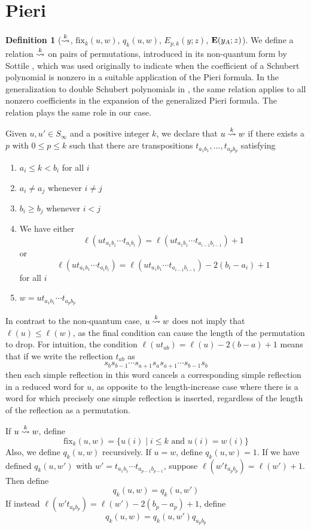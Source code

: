 \documentclass{amsart}
\theoremstyle{definition}
\newtheorem{definition}[lemma]{Definition}
\theoremstyle{remark}
\numberwithin{equation}{section}
\newcommand{\xrightsquigarrow}[2][]{%
	\mathrel{\mathop{\rightsquigarrow}\limits^{\scriptstyle #2}%
	\ifx\hfuzz#1\hfuzz\else_{\scriptstyle #1}\fi}%
}
\newcommand{\tom}[1]{\ensuremath{\xrightsquigarrow{#1}}}
\newcommand{\fx}{\mathrm{fix}}
\begin{document}
\section{Pieri}

\begin{definition}[$\tom{k}$, $\fx_{k}(u,w)$, $q_k(u,w)$, $E_{p,k}(y;z)$, $\mathbf{E}(y_A;z)$] \label{definition:pieri}
We define a relation $\tom{k}$ on pairs of permutations, introduced in its non-quantum form by Sottile \cite{sottile}, which was used originally to indicate when the coefficient of a Schubert polynomial is nonzero in a suitable application of the Pieri formula. In the generalization to double Schubert polynomials in \cite{samuelmolev}, the same relation applies to all nonzero coefficients in the expansion of the generalized Pieri formula. The relation plays the same role in our case. 

Given $u,u'\in S_\infty$ and a positive integer $k$, we declare that $u\tom{k} w$ if there exists a $p$ with $0\leq p\leq k$ such that there are transpositions $t_{a_1b_1},\ldots,t_{a_pb_p}$ satisfying 
\begin{enumerate}
\item $a_i\leq k<b_i$ for all $i$
\item $a_i\neq a_j$ whenever $i\neq j$
\item $b_i\geq b_j$ whenever $i<j$
\item We have either
$$\ell(ut_{a_1b_1}\cdots t_{a_ib_i})=\ell(ut_{a_1b_1}\cdots t_{a_{i-1}b_{i-1}})+1$$ 
or 
$$\ell(ut_{a_1b_1}\cdots t_{a_ib_i})=\ell(ut_{a_1b_1}\cdots t_{a_{i-1}b_{i-1}})-2(b_i-a_i)+1$$
for all $i$
\item $w=ut_{a_1b_1}\cdots t_{a_pb_p}$
\end{enumerate}
In contrast to the non-quantum case, $u\tom{k} w$ does not imply that $\ell(u) \leq \ell(w)$, as the final condition can cause the length of the permutation to drop. For intuition, the condition $\ell(ut_{ab}) = \ell(u) - 2(b - a) + 1$ means that if we write the reflection $t_{ab}$ as
$$s_{b}s_{b-1}\cdots s_{a+1}s_as_{a+1}\cdots s_{b-1}s_b$$
then each simple reflection in this word cancels a corresponding simple reflection in a reduced word for $u$, as opposite to the length-increase case where there is a word for which precisely one simple reflection is inserted, regardless of the length of the reflection as a permutation.

If $u\tom{k} w$, define 
$$\fx_{k}(u,w)=\{u(i)\mid i\leq k\mbox{ and }u(i)=w(i)\}$$
Also, we define $q_k(u,w)$ recursively. If $u=w$, define $q_k(u,w)=1$. If we have defined $q_k(u,w')$ with $w'=t_{a_1b_1}\cdots t_{a_{p-1}b_{p-1}}$, suppose $\ell(w't_{a_pb_p})=\ell(w')+1$. Then define
$$q_k(u,w)=q_k(u,w')$$
If instead $\ell(w't_{a_pb_p})=\ell(w')-2(b_p-a_p)+1$, define
$$q_k(u,w)=q_k(u,w')q_{a_pb_p}$$


\end{definition}
\end{document}
